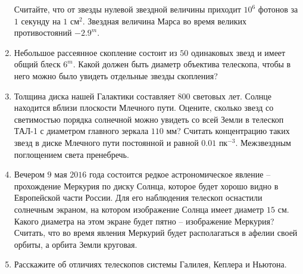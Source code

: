 \documentclass[12pt]{article}
\begin{document}
\begin{enumerate}
        Считайте, что от звезды нулевой звездной величины приходит $10^6$ фотонов за $1$ секунду на $1$ см$^2$. Звездная величина Марса во время великих противостояний $-2.9^m$.
        \item Небольшое рассеянное скопление состоит из $50$ одинаковых звезд и имеет общий блеск $6^m$. Какой должен быть диаметр объектива телескопа, чтобы в него можно было увидеть отдельные звезды скопления?
        \item Толщина диска нашей Галактики составляет $800$ световых лет. Солнце находится вблизи плоскости Млечного пути. Оцените, сколько звезд со светимостью порядка солнечной можно увидеть со всей Земли в телескоп ТАЛ-1 с диаметром главного зеркала $110$ мм? Считать концентрацию таких звезд в диске Млечного пути постоянной и равной $0.01$ пк$^{-3}$. Межзвездным поглощением света пренебречь.
        \item Вечером $9$ мая $2016$ года состоится редкое астрономическое явление -- прохождение Меркурия по диску Солнца, которое будет хорошо видно в Европейской части России. Для его наблюдения телескоп оснастили солнечным экраном, на котором изображение Солнца имеет диаметр $15$ см. Какого диаметра на этом экране будет пятно -- изображение Меркурия? Считать, что во время явления Меркурий будет располагаться в афелии своей орбиты, а орбита Земли круговая.
        \item Расскажите об отличиях телескопов системы Галилея, Кеплера и Ньютона.
    \end{enumerate}
\end{document}
